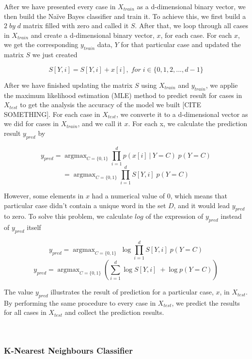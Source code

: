 \documentclass[conference]{IEEEtran}
\DeclareMathOperator*{\argmax}{argmax}
\newcommand\givenbase[1][]{\:#1\lvert\:}
\let\given\givenbase
\begin{document}
After we have presented every case in \(X_{train}\) as a d-dimensional binary vector, we then build the Naïve Bayes classifier and train it. To achieve this, we first build a \(2 \; by \; d\) matrix filled with zero and called it \(S\). After that, we loop through all cases in \(X_{train}\) and create a d-dimensional binary vector, \(x\), for each case. For each \(x\), we get the corresponding \(y_{train}\) data, \(Y\) for that particular case and updated the matrix \(S\) we just created

\[S[Y, i] = S[Y, i] + x[i], \; for \; i \in \{0, 1, 2, ..., d - 1\} \]

After we have finished updating the matrix \(S\) using \(X_{train}\) and \(y_{train}\), we applie the maximum likelihood estimation (MLE) method to predict result for cases in \(X_{test}\) to get the analysis the accuracy of the model we built [CITE SOMETHING]. For each case in \(X_{test}\), we converte it to a d-dimensional vector as we did for cases in \(X_{train}\), and we call it \(x\). For each x, we calculate the prediction result \(y_{pred}\) by 

\[y_{pred} = \argmax_{C=\{0, 1\}} \prod_{i = 1}^{d} p(x[i] \given Y = C) \; p(Y = C)\]
\[= \argmax_{C=\{0, 1\}} \prod_{i = 1}^{d} S[Y, i] \; p(Y = C)\]

However, some elements in \(x\) had a numerical value of 0, which means that particular case didn't contain a unique word in the set \(D\), and it would lead \(y_{pred}\) to zero. To solve this problem, we calculate \(log\) of the expression of \(y_{pred}\) instead of \(y_{pred}\) itself

\[y_{pred} = \argmax_{C=\{0, 1\}} \; \log\prod_{i = 1}^{d} S[Y, i] \; p(Y = C)\]
\[y_{pred} = \argmax_{C=\{0, 1\}} (\sum_{i = 1}^{d} \log S[Y, i] \; + \log p(Y = C) )\]

The value \(y_{pred}\) illustrates the result of prediction for a particular case, \(x\), in \(X_{test}\). By performing the same procedure to every case in \(X_{test}\), we predict the results for all cases in \(X_{test}\) and collect the prediction results. 

\hfill\\

\subsubsection{K-Nearest Neighbours Classifier}
\end{document}
